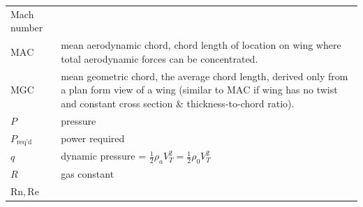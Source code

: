 \documentclass[
]{book}
\begin{document}
\begin{longtable}[]{@{}ll@{}}
\begin{minipage}[t]{0.72\columnwidth}
Mach number\strut
\end{minipage}\tabularnewline
\begin{minipage}[t]{0.22\columnwidth}\raggedright
\(\mathrm{MAC}\)\strut
\end{minipage} & \begin{minipage}[t]{0.72\columnwidth}\raggedright
mean aerodynamic chord, chord length of location on wing where total aerodynamic forces can be concentrated.\strut
\end{minipage}\tabularnewline
\begin{minipage}[t]{0.22\columnwidth}\raggedright
\(\mathrm{MGC}\)\strut
\end{minipage} & \begin{minipage}[t]{0.72\columnwidth}\raggedright
mean geometric chord, the average chord length, derived only from a plan form view of a wing (similar to \(\mathrm{MAC}\) if wing has no twist and constant cross section \& thickness-to-chord ratio).\strut
\end{minipage}\tabularnewline
\begin{minipage}[t]{0.22\columnwidth}\raggedright
\(P\)\strut
\end{minipage} & \begin{minipage}[t]{0.72\columnwidth}\raggedright
pressure\strut
\end{minipage}\tabularnewline
\begin{minipage}[t]{0.22\columnwidth}\raggedright
\(P_\text{req'd}\)\strut
\end{minipage} & \begin{minipage}[t]{0.72\columnwidth}\raggedright
power required\strut
\end{minipage}\tabularnewline
\begin{minipage}[t]{0.22\columnwidth}\raggedright
\(q\)\strut
\end{minipage} & \begin{minipage}[t]{0.72\columnwidth}\raggedright
dynamic pressure = \(\frac{1}{2} \rho_a V_T^2 = \frac{1}{2} \rho_0 V_T^2\)\strut
\end{minipage}\tabularnewline
\begin{minipage}[t]{0.22\columnwidth}\raggedright
\(R\)\strut
\end{minipage} & \begin{minipage}[t]{0.72\columnwidth}\raggedright
gas constant\strut
\end{minipage}\tabularnewline
\begin{minipage}[t]{0.22\columnwidth}\raggedright
\(\mathrm{Rn},\mathrm{Re}\)\strut

\end{minipage}
\end{longtable}
\end{document}
